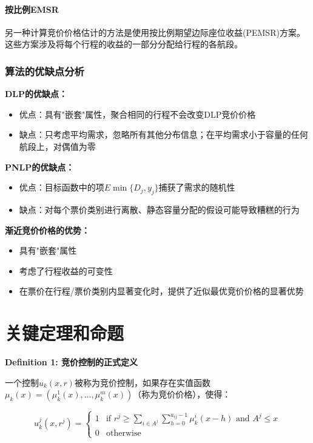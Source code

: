 \documentclass[
  10pt
]{article}
\begin{document}
\paragraph{按比例EMSR}
另一种计算竞价价格估计的方法是使用按比例期望边际座位收益(PEMSR)方案。这些方案涉及将每个行程的收益的一部分分配给行程的各航段。

\subsubsection{算法的优缺点分析}

\textbf{DLP的优缺点：}
\begin{itemize}
\item 优点：具有"嵌套"属性，聚合相同的行程不会改变DLP竞价价格
\item 缺点：只考虑平均需求，忽略所有其他分布信息；在平均需求小于容量的任何航段上，对偶值为零
\end{itemize}

\textbf{PNLP的优缺点：}
\begin{itemize}
\item 优点：目标函数中的项$E \min\{D_j, y_j\}$捕获了需求的随机性
\item 缺点：对每个票价类别进行离散、静态容量分配的假设可能导致糟糕的行为
\end{itemize}

\textbf{渐近竞价价格的优势：}
\begin{itemize}
\item 具有"嵌套"属性
\item 考虑了行程收益的可变性
\item 在票价在行程/票价类别内显著变化时，提供了近似最优竞价价格的显著优势
\end{itemize}

\section{关键定理和命题}

\begin{definitionbox}
\textbf{Definition 1: 竞价控制的正式定义}

一个控制$u_k(x,r)$被称为竞价控制，如果存在实值函数$\mu_k(x) = (\mu_k^1(x), \ldots, \mu_k^m(x))$（称为竞价价格），使得：

$$u_k^j(x,r^j) = \begin{cases}
1 & \text{if } r^j \geq \sum_{i \in A^j} \sum_{h=0}^{a_{ij}-1} \mu_k^i(x-h) \text{ and } A^j \leq x \\
0 & \text{otherwise}
\end{cases}$$
\end{definitionbox}
\end{document}
